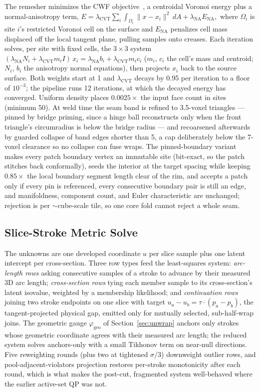 The remesher minimizes the CWF objective~\cite{xu2024cwf}, a centroidal Voronoi energy plus a normal-anisotropy term,
$E = \lambda_{\mathrm{CVT}} \sum_i \int_{\Omega_i} \lVert x - x_i\rVert^2 \, dA + \lambda_{\mathrm{NA}} E_{\mathrm{NA}},$
where $\Omega_i$ is site $i$'s restricted Voronoi cell on the surface and $E_{\mathrm{NA}}$ penalizes cell mass displaced off the local tangent plane, pulling samples onto creases. Each iteration solves, per site with fixed cells, the $3\times3$ system $(\lambda_{\mathrm{NA}} N_i + \lambda_{\mathrm{CVT}} m_i I)\,x_i = \lambda_{\mathrm{NA}} b_i + \lambda_{\mathrm{CVT}} m_i c_i$ ($m_i$, $c_i$ the cell's mass and centroid; $N_i$, $b_i$ the anisotropy normal equations), then projects $x_i$ back to the source surface. Both weights start at 1 and $\lambda_{\mathrm{CVT}}$ decays by 0.95 per iteration to a floor of $10^{-3}$; the pipeline runs 12 iterations, at which the decayed energy has converged. Uniform density places $0.0025\times$ the input face count in sites (minimum 50). At weld time the seam band is refined to 3.5-voxel triangles --- pinned by bridge priming, since a hinge ball reconstructs only when the front triangle's circumradius is below the bridge radius --- and recoarsened afterwards by guarded collapse of band edges shorter than 5, a cap deliberately below the 7-voxel clearance so no collapse can fuse wraps. The pinned-boundary variant makes every patch boundary vertex an immutable site (bit-exact, so the patch stitches back conformally), seeds the interior at the target spacing while keeping $0.85\times$ the local boundary segment length clear of the rim, and accepts a patch only if every pin is referenced, every consecutive boundary pair is still an edge, and manifoldness, component count, and Euler characteristic are unchanged; rejection is per $\sim$cube-scale tile, so one core fold cannot reject a whole seam.

\subsection{Slice-Stroke Metric Solve}
\label{app:slice}

The unknowns are one developed coordinate $u$ per slice sample plus one latent intercept per cross-section. Three row types feed the least-squares system: {\em arc-length rows} asking consecutive samples of a stroke to advance by their measured 3D arc length; {\em cross-section rows} tying each member sample to its cross-section's latent isovalue, weighted by a membership likelihood; and {\em continuation rows} joining two stroke endpoints on one slice with target $u_a - u_b = \tau \cdot (p_a - p_b)$, the tangent-projected physical gap, emitted only for mutually selected, sub-half-wrap joins. The geometric gauge $\varphi_{\mathrm{geo}}$ of Section~\ref{sec:unwrap} anchors only strokes whose geometric coordinate agrees with their measured arc length; the reduced system solves anchors-only with a small Tikhonov term on near-null directions. Five reweighting rounds (plus two at tightened $\sigma/3$) downweight outlier rows, and pool-adjacent-violators projection restores per-stroke monotonicity after each round, which is what makes the post-cut, fragmented system well-behaved where the earlier active-set QP was not.


